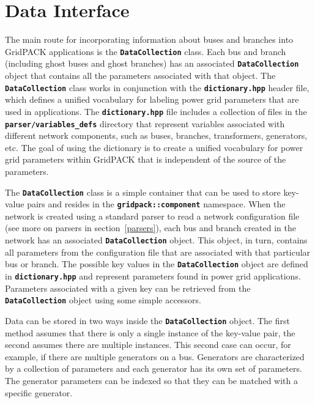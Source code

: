 \section{Data Interface}\label{data_interface}

The main route for incorporating information about buses and branches into
GridPACK applications is the \texttt{\textbf{DataCollection}} class. Each bus
and branch (including ghost buses and ghost branches) has an associated
\texttt{\textbf{DataCollection}} object that contains all the parameters
associated with that object. The \texttt{\textbf{DataCollection}} class works in
conjunction with the \texttt{\textbf{dictionary.hpp}} header file, which defines
a unified vocabulary for labeling power grid parameters that are used in
applications. The \texttt{\textbf{dictionary.hpp}} file includes a collection of
files in the \texttt{\textbf{parser/variables\_defs}} directory that represent
variables associated with different network components,
such as buses, branches, transformers, generators, etc. The goal of using the dictionary is to create a unified vocabulary for power grid parameters within GridPACK that is independent of the source of the parameters.

The \texttt{\textbf{DataCollection}} class is a simple container that can be
used to store key-value pairs and resides in the
\texttt{\textbf{gridpack::component}} namespace. When the network is created
using a standard parser to read a network configuration file (see more on
parsers in section~\ref{parsers}), each bus and branch created in the network
has an associated \texttt{\textbf{DataCollection}} object. This object, in turn,
contains all parameters from the configuration file that are associated with
that particular bus or branch. The possible key values in the
\texttt{\textbf{DataCollection}} object are defined in
\texttt{\textbf{dictionary.hpp}} and represent parameters found in power grid
applications.  Parameters associated with a given key can be retrieved from the
\texttt{\textbf{DataCollection}} object using some simple accessors.

Data can be stored in two ways inside the \texttt{\textbf{DataCollection}} object. The first method assumes that there is only a single instance of the key-value pair, the second assumes there are multiple instances. This second case can occur, for example, if there are multiple generators on a bus. Generators are characterized by a collection of parameters and each generator has its own set of parameters. The generator parameters can be indexed so that they can be matched with a specific generator.

